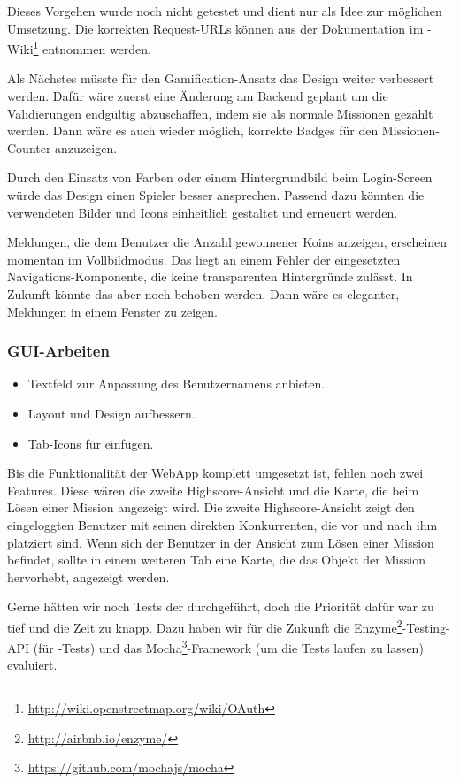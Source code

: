 Dieses Vorgehen wurde noch nicht getestet und dient nur als Idee zur möglichen Umsetzung.
Die korrekten Request-URLs können aus der Dokumentation im -Wiki\footnote{\url{http://wiki.openstreetmap.org/wiki/OAuth}} entnommen werden.

Als Nächstes müsste für den \gls{Gamification}-Ansatz das Design weiter verbessert werden. 
Dafür wäre zuerst eine Änderung am Backend geplant um die Validierungen endgültig abzuschaffen, indem sie als normale Missionen gezählt werden. 
Dann wäre es auch wieder möglich, korrekte Badges für den Missionen-Counter anzuzeigen. 

Durch den Einsatz von Farben oder einem Hintergrundbild beim Login-Screen würde das Design einen Spieler besser ansprechen. 
Passend dazu könnten die verwendeten Bilder und Icons einheitlich gestaltet und erneuert werden. 

Meldungen, die dem Benutzer die Anzahl gewonnener Koins anzeigen, erscheinen momentan im Vollbildmodus. 
Das liegt an einem Fehler der eingesetzten Navigations-Komponente, die keine transparenten Hintergründe zulässt. 
In Zukunft könnte das aber noch behoben werden. 
Dann wäre es eleganter, Meldungen in einem Fenster zu zeigen.

\subsubsection{GUI-Arbeiten}
\begin{itemize}
	\item Textfeld zur Anpassung des Benutzernamens anbieten.
	\item Layout und Design aufbessern.
	\item Tab-Icons für  einfügen.
\end{itemize}

Bis die Funktionalität der \gls{WebApp} komplett umgesetzt ist, fehlen noch zwei Features. 
Diese wären die zweite Highscore-Ansicht und die Karte, die beim Lösen einer Mission angezeigt wird. 
Die zweite Highscore-Ansicht zeigt den eingeloggten Benutzer mit seinen direkten Konkurrenten, die vor und nach ihm platziert sind. 
Wenn sich der Benutzer in der Ansicht zum Lösen einer Mission befindet, sollte in einem weiteren Tab eine Karte, die das Objekt der Mission hervorhebt, angezeigt werden. 

Gerne hätten wir noch Tests der  durchgeführt, doch die Priorität dafür war zu tief und die Zeit zu knapp. 
Dazu haben wir für die Zukunft die Enzyme\footnote{\url{http://airbnb.io/enzyme/}}-Testing-API (für -Tests) und das Mocha\footnote{\url{https://github.com/mochajs/mocha}}-\gls{Framework} (um die Tests laufen zu lassen) evaluiert.

